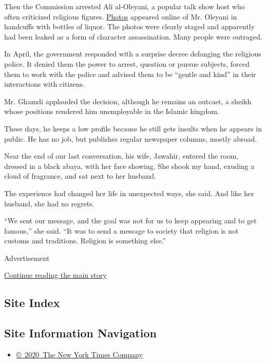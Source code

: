 Then the Commission arrested Ali al-Oleyani, a popular talk show host
who often criticized religious figures.
\href{http://hawl-alkhaleej.sa/8180.html}{Photos} appeared online of Mr.
Oleyani in handcuffs with bottles of liquor. The photos were clearly
staged and apparently had been leaked as a form of character
assassination. Many people were outraged.

In April, the government responded with a surprise decree defanging the
religious police. It denied them the power to arrest, question or pursue
subjects, forced them to work with the police and advised them to be
``gentle and kind'' in their interactions with citizens.

Mr. Ghamdi applauded the decision, although he remains an outcast, a
sheikh whose positions rendered him unemployable in the Islamic kingdom.

These days, he keeps a low profile because he still gets insults when he
appears in public. He has no job, but publishes regular newspaper
columns, mostly abroad.

Near the end of our last conversation, his wife, Jawahir, entered the
room, dressed in a black abaya, with her face showing. She shook my
hand, exuding a cloud of fragrance, and sat next to her husband.

The experience had changed her life in unexpected ways, she said. And
like her husband, she had no regrets.

``We sent our message, and the goal was not for us to keep appearing and
to get famous,'' she said. ``It was to send a message to society that
religion is not customs and traditions. Religion is something else.''

Advertisement

\protect\hyperlink{after-bottom}{Continue reading the main story}

\hypertarget{site-index}{%
\subsection{Site Index}\label{site-index}}

\hypertarget{site-information-navigation}{%
\subsection{Site Information
Navigation}\label{site-information-navigation}}

\begin{itemize}
\tightlist
\item
  \href{https://help.nytimes.com/hc/en-us/articles/115014792127-Copyright-notice}{©~2020~The
  New York Times Company}
\end{itemize}

